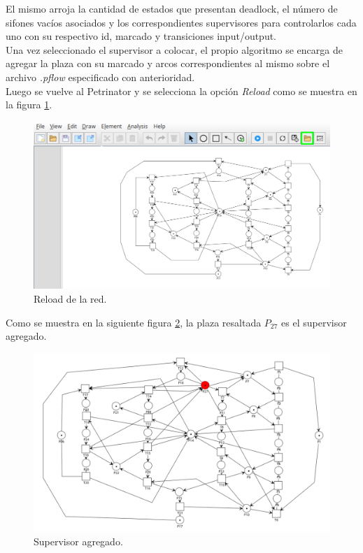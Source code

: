 El mismo arroja la cantidad de estados que presentan deadlock, el número de sifones vacíos asociados y los correspondientes supervisores para controlarlos cada uno con su respectivo id, marcado y transiciones input/output. \\
Una vez seleccionado el supervisor a colocar, el propio algoritmo se encarga de agregar la plaza con su marcado y arcos correspondientes al mismo sobre el archivo \textit{.pflow} especificado con anterioridad. \\
Luego se vuelve al Petrinator y se selecciona la opción \textit{Reload} como se muestra en la figura \ref{fig:b-reload}.

\begin{figure} [H]
    \centering
    \includegraphics[width=\textwidth]{Figures/apendiceB/POPN_reload.png}
    \caption{Reload de la red.}
    \label{fig:b-reload}
\end{figure}

\noindent Como se muestra en la siguiente figura \ref{fig:b-supervisor}, la plaza resaltada $P_{27}$ es el supervisor agregado.

\begin{figure} [H]
    \centering
    \includegraphics[scale=0.45]{Figures/apendiceB/Primer-supervisor.png}
    \caption{Supervisor agregado.}
    \label{fig:b-supervisor}
\end{figure}

